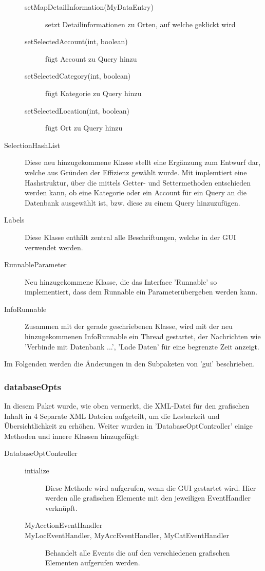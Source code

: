 \begin{description}
\begin{description}
			\item[setMapDetailInformation(MyDataEntry)] setzt Detailinformationen zu Orten, auf welche geklickt wird
			\item[setSelectedAccount(int, boolean)] fügt Account zu Query hinzu
			\item[setSelectedCategory(int, boolean)] fügt Kategorie zu Query hinzu
			\item[setSelectedLocation(int, boolean)] fügt Ort zu Query hinzu
		\end{description}
		\item [SelectionHashList]
		\quad
		Diese neu hinzugekommene Klasse stellt  eine Ergänzung zum Entwurf dar, welche aus Gründen der Effizienz gewählt wurde. Mit implemtiert eine Hashstruktur, über die mittels Getter- und Settermethoden entschieden werden kann, ob eine Kategorie oder ein Account für ein Query an die Datenbank ausgewählt ist, bzw. diese zu einem Query hinzuzufügen.
		\item [Labels] 
		\quad
		Diese Klasse enthält zentral alle Beschriftungen, welche in der GUI verwendet werden.
		\item [RunnableParameter] 
		\quad 
		Neu hinzugekommene Klasse, die das Interface 'Runnable' so implementiert, dass dem Runnable ein Parameterübergeben werden kann.
		\item[InfoRunnable] 
		\quad
		Zusammen mit der gerade geschriebenen Klasse, wird mit der neu hinzugekommenen InfoRunnable ein Thread gestartet, der Nachrichten wie 'Verbinde mit Datenbank ...', 'Lade Daten' für eine begrenzte Zeit anzeigt.	
	\end{description}
		Im Folgenden werden die Änderungen in den Subpaketen von 'gui' beschrieben.
		\subsubsection{databaseOpts}
		In diesem Paket wurde, wie oben vermerkt, die XML-Datei für den grafischen Inhalt in 4 Separate XML Dateien aufgeteilt, um die Lesbarkeit und Übersichtlichkeit zu erhöhen.
		Weiter wurden in 'DatabaseOptController' einige Methoden und innere Klassen hinzugefügt:
		\begin{description}
			\item[DatabaseOptController] \quad
			
			\begin{description}
				\item[intialize]
				 \quad
				Diese Methode wird aufgerufen, wenn die GUI gestartet wird. Hier werden alle grafischen Elemente mit den jeweiligen EventHandler verknüpft.
				\item[MyAcctionEventHandler]
				\item[MyLocEventHandler, MyAccEventHandler, MyCatEventHandler] 
				\quad
				Behandelt alle Events die auf den verschiedenen grafischen Elementen aufgerufen werden.
			\end{description}
		\end{description}
	

